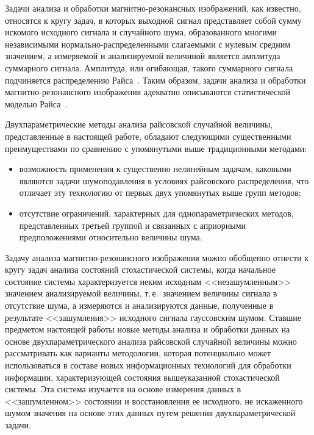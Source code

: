\begin{multicols}{2}
      Задачи анализа и обработки маг\-нит\-но-ре\-зо\-нансных изображений, как
известно, относятся к кругу задач, в которых выходной сигнал пред\-став\-ля\-ет собой сумму
искомого исходного сигнала и случайного шума, образованного многими независимыми
нор\-маль\-но-рас\-пре\-де\-лен\-ны\-ми сла\-га\-емыми с нулевым средним значением, а
измеряемой и анализируемой величиной является амплитуда суммарного сигнала.
Амплитуда, или огибающая, такого суммарного сигнала подчиняется распределению
Райса~\cite{14-ya}. Таким образом, задачи анализа и обработки
      маг\-нит\-но-ре\-зо\-нансно\-го изображения адекватно описываются
статистической моделью Райса~\cite{15-ya}.

      Двухпараметрические методы анализа рай\-совской случайной величины,
представленные в настоящей работе, обладают следующими существенными
преимуществами по сравнению с упомянутыми выше традиционными методами:
      \begin{itemize}
      \item возможность применения к существенно нелинейным задачам, каковыми
являются задачи шумоподавления в условиях райсовского распределения, что отличает
эту технологию от первых двух упомянутых выше групп методов;
      \item отсутствие ограничений, характерных для однопараметрических методов,
представленных третьей группой и связанных с априорными предположениями
относительно величины \mbox{шума}.
     \end{itemize}

     Задачу анализа магнит\-но-ре\-зо\-нансно\-го изображения можно обобщенно
отнести к кругу задач анализа состояний стохастической системы, когда начальное
состояние системы характеризуется неким исходным <<незашумленным>> значением
анализируемой величины, т.\,е.\ значением величины сигнала в отсутствие шума, а
измеряются и анализируются данные, полученные в результате <<зашумления>>
исходного сигнала гауссовским шумом. Ставшие предметом настоящей работы новые
методы анализа и обработки данных на основе двухпараметрического анализа райсовской
случайной величины можно рассматривать как варианты методологии, которая
потенциально может использоваться в составе новых информационных технологий для
обработки информации, характеризующей состояния вышеуказанной стохастической
системы. Эта сис\-те\-ма изучается на основе измерения данных в <<зашумленном>>
состоянии и восстановления ее исходного, не искаженного шумом значения на основе
этих данных путем решения двухпараметрической задачи.


\end{multicols}
